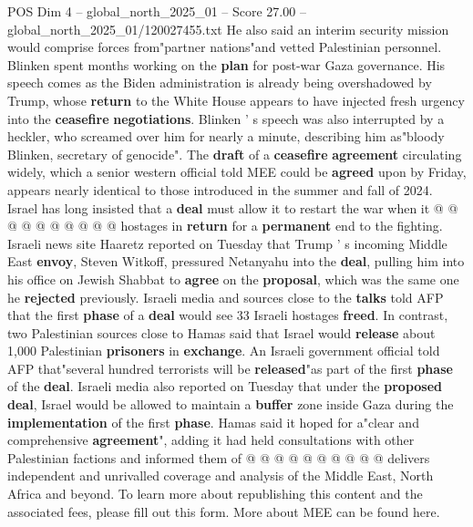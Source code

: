 \begin{textsample}{POS Dim 4 – global\_north\_2025\_01 – Score 27.00 – global\_north\_2025\_01/120027455.txt}
He also said an interim security mission would comprise forces from"partner nations"and vetted Palestinian personnel.
Blinken spent months working on the \textbf{plan} for post-war Gaza governance.
His speech comes as the Biden administration is already being overshadowed by Trump, whose \textbf{return} to the White House appears to have injected fresh urgency into the \textbf{ceasefire} \textbf{negotiations}.
Blinken ' s speech was also interrupted by a heckler, who screamed over him for nearly a minute, describing him as"bloody Blinken, secretary of genocide".
The \textbf{draft} of a \textbf{ceasefire} \textbf{agreement} circulating widely, which a senior western official told MEE could be \textbf{agreed} upon by Friday, appears nearly identical to those introduced in the summer and fall of 2024.
Israel has long insisted that a \textbf{deal} must allow it to restart the war when it @ @ @ @ @ @ @ @ @ @ hostages in \textbf{return} for a \textbf{permanent} end to the fighting.
Israeli news site Haaretz reported on Tuesday that Trump ' s incoming Middle East \textbf{envoy}, Steven Witkoff, pressured Netanyahu into the \textbf{deal}, pulling him into his office on Jewish Shabbat to \textbf{agree} on the \textbf{proposal}, which was the same one he \textbf{rejected} previously.
Israeli media and sources close to the \textbf{talks} told AFP that the first \textbf{phase} of a \textbf{deal} would see 33 Israeli hostages \textbf{freed}.
In contrast, two Palestinian sources close to Hamas said that Israel would \textbf{release} about 1,000 Palestinian \textbf{prisoners} in \textbf{exchange}.
An Israeli government official told AFP that"several hundred terrorists will be \textbf{released}"as part of the first \textbf{phase} of the \textbf{deal}.
Israeli media also reported on Tuesday that under the \textbf{proposed} \textbf{deal}, Israel would be allowed to maintain a \textbf{buffer} zone inside Gaza during the \textbf{implementation} of the first \textbf{phase}.
Hamas said it hoped for a"clear and comprehensive \textbf{agreement}", adding it had held consultations with other Palestinian factions and informed them of @ @ @ @ @ @ @ @ @ @ delivers independent and unrivalled coverage and analysis of the Middle East, North Africa and beyond.
To learn more about republishing this content and the associated fees, please fill out this form.
More about MEE can be found here.

\end{textsample}
